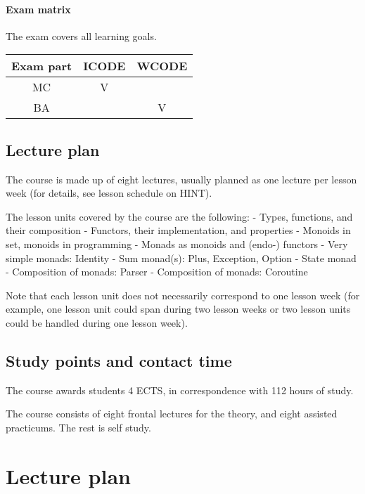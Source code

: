 \documentclass{article}
\begin{document}
\paragraph{Exam matrix}\label{exam-matrix}

The exam covers all learning goals.
\begin{table}[!h]
		\centering
	\begin{tabular}{|c|c|c|}
	\hline
	Exam part & ICODE & WCODE \\
	\hline
	MC & V & \\
	\hline
	BA & & V \\
	\hline
	\end{tabular}
\end{table}

    \subsection{Lecture plan}\label{lecture-plan}

The course is made up of eight lectures, usually planned as one lecture
per lesson week (for details, see lesson schedule on HINT).

The lesson units covered by the course are the following: - Types,
functions, and their composition - Functors, their implementation, and
properties - Monoids in set, monoids in programming - Monads as monoids
and (endo-) functors - Very simple monads: Identity - Sum monad(s):
Plus, Exception, Option - State monad - Composition of monads: Parser -
Composition of monads: Coroutine

Note that each lesson unit does not necessarily correspond to one lesson
week (for example, one lesson unit could span during two lesson weeks or
two lesson units could be handled during one lesson week).

    \subsection{Study points and contact
time}\label{study-points-and-contact-time}

The course awards students 4 ECTS, in correspondence with 112 hours of
study.

The course consists of eight frontal lectures for the theory, and eight
assisted practicums. The rest is self study.

\section{Lecture plan}\label{lecture-plan}
\end{document}
